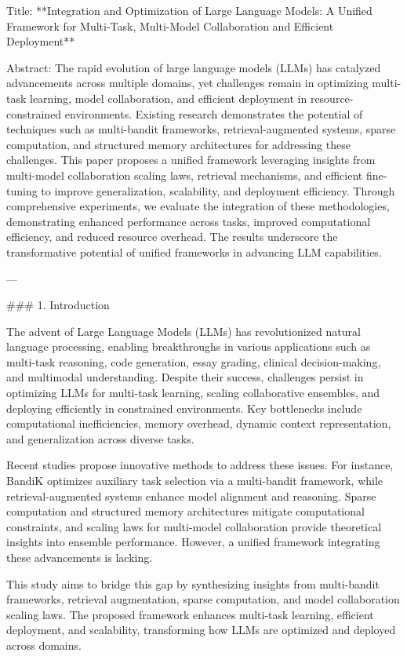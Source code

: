 Title: **Integration and Optimization of Large Language Models: A Unified Framework for Multi-Task, Multi-Model Collaboration and Efficient Deployment**

Abstract:  
The rapid evolution of large language models (LLMs) has catalyzed advancements across multiple domains, yet challenges remain in optimizing multi-task learning, model collaboration, and efficient deployment in resource-constrained environments. Existing research demonstrates the potential of techniques such as multi-bandit frameworks, retrieval-augmented systems, sparse computation, and structured memory architectures for addressing these challenges. This paper proposes a unified framework leveraging insights from multi-model collaboration scaling laws, retrieval mechanisms, and efficient fine-tuning to improve generalization, scalability, and deployment efficiency. Through comprehensive experiments, we evaluate the integration of these methodologies, demonstrating enhanced performance across tasks, improved computational efficiency, and reduced resource overhead. The results underscore the transformative potential of unified frameworks in advancing LLM capabilities.

---

### 1. Introduction  

The advent of Large Language Models (LLMs) has revolutionized natural language processing, enabling breakthroughs in various applications such as multi-task reasoning, code generation, essay grading, clinical decision-making, and multimodal understanding. Despite their success, challenges persist in optimizing LLMs for multi-task learning, scaling collaborative ensembles, and deploying efficiently in constrained environments. Key bottlenecks include computational inefficiencies, memory overhead, dynamic context representation, and generalization across diverse tasks.  

Recent studies propose innovative methods to address these issues. For instance, BandiK optimizes auxiliary task selection via a multi-bandit framework, while retrieval-augmented systems enhance model alignment and reasoning. Sparse computation and structured memory architectures mitigate computational constraints, and scaling laws for multi-model collaboration provide theoretical insights into ensemble performance. However, a unified framework integrating these advancements is lacking.  

This study aims to bridge this gap by synthesizing insights from multi-bandit frameworks, retrieval augmentation, sparse computation, and model collaboration scaling laws. The proposed framework enhances multi-task learning, efficient deployment, and scalability, transforming how LLMs are optimized and deployed across domains.  

